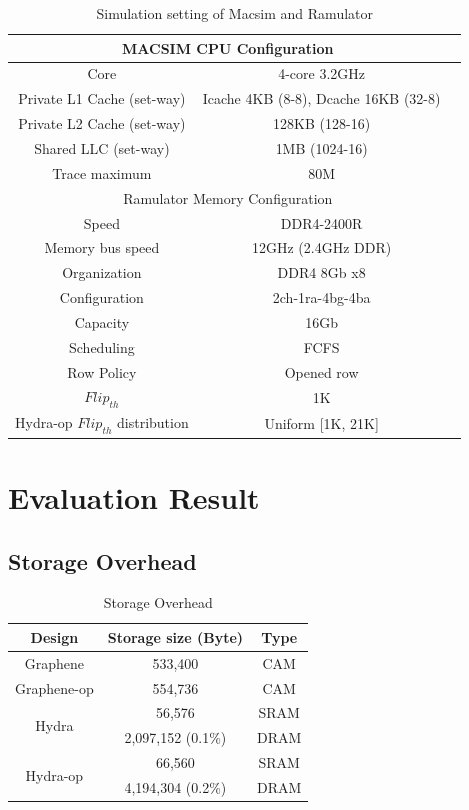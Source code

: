 \begin{table}[t]
\centering
  \caption{Simulation setting of Macsim and Ramulator}
  \label{tab:Sim_setting}
  \begin{tabular}[width=\textwidth]{|c|c|c|}
  \toprule
    \multicolumn{2}{|c|}{MACSIM CPU Configuration} \\
  \midrule 
    Core &  4-core \@ 3.2GHz \\ 
    Private L1 Cache (set-way) &  Icache 4KB (8-8), Dcache 16KB (32-8) \\
    Private L2 Cache (set-way) & 128KB (128-16) \\
    Shared LLC (set-way) & 1MB (1024-16) \\
    Trace maximum & 80M \\
  \toprule
    \multicolumn{2}{|c|}{Ramulator Memory Configuration} \\
  \midrule 
    Speed & DDR4-2400R \\ 
    Memory bus speed & 12GHz (2.4GHz DDR) \\
    Organization & DDR4 8Gb x8 \\ 
    Configuration & 2ch-1ra-4bg-4ba \\
    Capacity & 16Gb \\
    Scheduling &  FCFS \\
    Row Policy & Opened row \\
    $Flip_{th}$ & 1K \\
    Hydra-op $Flip_{th}$ distribution & Uniform [1K, 21K] \\
  \bottomrule
  \end{tabular}
\end{table}

\section{Evaluation Result}
\label{sec:evaluation-result}

\subsection{Storage Overhead}
\label{sec:storage-overhead}

\begin{table}
  \caption{Storage Overhead}
  \label{wrap-tab:Storage}
  \begin{tabular}{|c|c|c|}
  \toprule
    Design & Storage size (Byte) & Type \\
  \midrule 
    Graphene & 533,400 & CAM \\ \hline
    Graphene-op & 554,736 & CAM \\ \hline
    \multirow{2}{*}{Hydra} & 56,576 & SRAM \\ 
       & 2,097,152 (0.1\%) & DRAM \\ \hline
    \multirow{2}{*}{Hydra-op} & 66,560 & SRAM \\ 
       & 4,194,304 (0.2\%) & DRAM \\ 
  \bottomrule
  \end{tabular}
\end{table}

